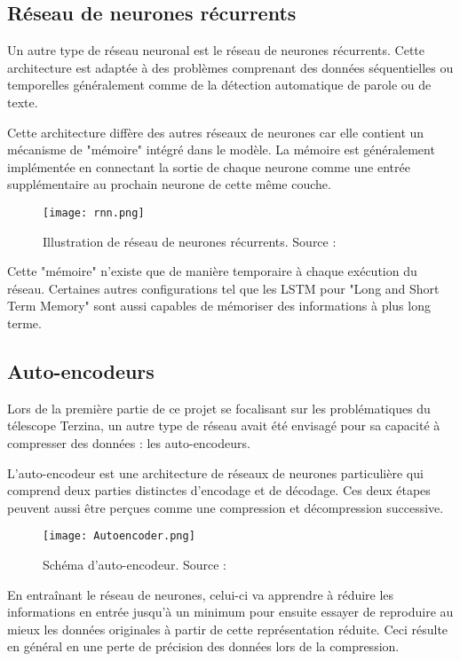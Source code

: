 \subsection{Réseau de neurones récurrents}

Un autre type de réseau neuronal est le réseau de neurones récurrents. Cette architecture est adaptée
à des problèmes comprenant des données séquentielles ou temporelles généralement comme de la détection automatique de parole ou de texte.

Cette architecture diffère des autres réseaux de neurones car elle contient un mécanisme de "mémoire" intégré dans le modèle.
La mémoire est généralement implémentée en connectant la sortie de chaque neurone comme une entrée supplémentaire au prochain neurone de cette même couche.

\begin{figure}[tbph!]
	\centering
	\texttt{[image: rnn.png]}
	\caption[Illustration de réseau de neurones récurrents]{Illustration de réseau de neurones récurrents. Source : \cite{RnnImage}}
\end{figure}

Cette "mémoire" n'existe que de manière temporaire à chaque exécution du réseau. Certaines autres configurations tel que les LSTM pour "Long and Short Term Memory"
sont aussi capables de mémoriser des informations à plus long terme.

\subsection{Auto-encodeurs}

Lors de la première partie de ce projet se focalisant sur les problématiques du télescope Terzina, un autre type de réseau 
avait été envisagé pour sa capacité à compresser des données : les auto-encodeurs.

L'auto-encodeur est une architecture de réseaux de neurones particulière qui comprend deux parties distinctes d'encodage et de décodage. 
Ces deux étapes peuvent aussi être perçues comme une compression et décompression successive. \cite{IbmAutoencoder}

\begin{figure}[tbph!]
	\centering
	\texttt{[image: Autoencoder.png]}
	\caption[Schéma d'auto-encodeur]{Schéma d'auto-encodeur. Source : \cite{Autoencoder}}
\end{figure}

En entraînant le réseau de neurones, celui-ci va apprendre à réduire les informations en entrée jusqu'à un minimum pour 
ensuite essayer de reproduire au mieux les données originales à partir de cette représentation réduite.
Ceci résulte en général en une perte de précision des données lors de la compression.

